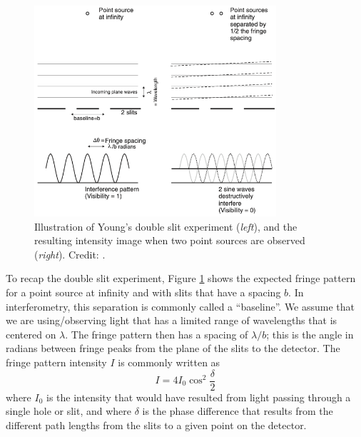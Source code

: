 \documentclass[11pt]{article}
\begin{document}
\begin{figure}[h]
    \centering
    \includegraphics[width=0.8\textwidth]{doc/youngs.png}
    \caption{Illustration of Young's double slit experiment (\emph{left}), and the resulting intensity image when two point sources are observed (\emph{right}). Credit: \citet{2003RPPh...66..789M}.}
    \label{fig:youngs}
\end{figure}

To recap the double slit experiment, Figure \ref{fig:youngs} shows the expected fringe pattern for a point source at infinity and with slits that have a spacing $b$. In interferometry, this separation is commonly called a ``baseline''. We assume that we are using/observing light that has a limited range of wavelengths that is centered on $\lambda$. The fringe pattern then has a spacing of $\lambda/b$; this is the angle in radians between fringe peaks from the plane of the slits to the detector. The fringe pattern intensity $I$ is commonly written as
\begin{equation}\label{eq:fringepattern}
    I = 4 I_0 \cos^2 \frac{\delta}{2}
\end{equation}
where $I_0$ is the intensity that would have resulted from light passing through a single hole or slit, and where $\delta$ is the phase difference that results from the different path lengths from the slits to a given point on the detector.
\end{document}
